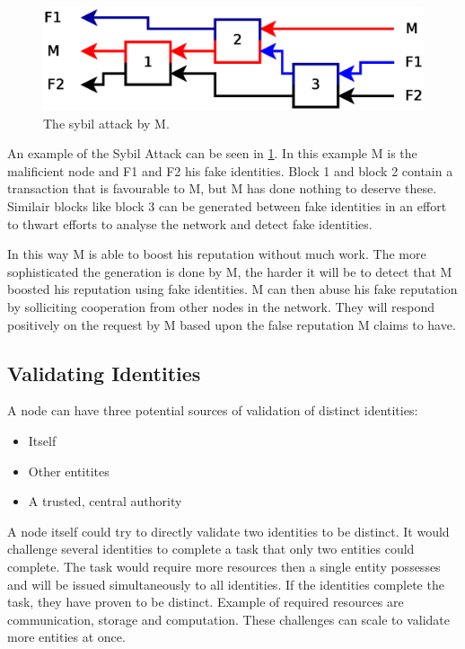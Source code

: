 \begin{figure}
	\centerline{\includegraphics[scale=0.3]{problems/figs/sybil.eps}}
	\caption{The sybil attack by M.}
	\label{fig:sybil-example}
\end{figure}

An example of the Sybil Attack can be seen in \ref{fig:sybil-example}.
In this example M is the malificient node and F1 and F2 his fake identities.
Block 1 and block 2 contain a transaction that is favourable to M,
but M has done nothing to deserve these.
Similair blocks like block 3 can be generated between fake identities in an effort to thwart efforts to analyse the network
and detect fake identities.

In this way M is able to boost his reputation without much work.
The more sophisticated the generation is done by M,
the harder it will be to detect that M boosted his reputation using fake identities.
M can then abuse his fake reputation by solliciting cooperation from other nodes in the network.
They will respond positively on the request by M based upon the false reputation M claims to have.

\subsection{Validating Identities}
A node can have three potential sources of validation of distinct identities:
\begin{itemize}
\item Itself
\item Other entitites
\item A trusted, central authority
\end{itemize}

A node itself could try to directly validate two identities to be distinct.
It would challenge several identities to complete a task that only two entities could complete.
The task would require more resources then a single entity possesses and will be issued simultaneously to all identities.
If the identities complete the task, they have proven to be distinct.
Example of required resources are communication, storage and computation.
These challenges can scale to validate more entities at once.

